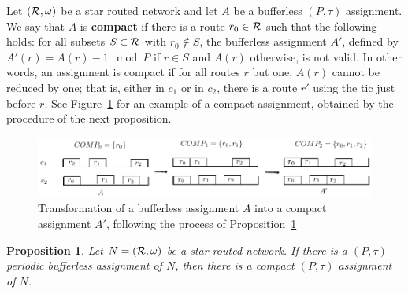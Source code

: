 \documentclass[a4paper,10pt]{journal}
\newtheorem{proposition}{Proposition}
\begin{document}
Let $({\cal R},\omega)$ be a star routed network and let $A$ be a bufferless $(P,\tau)$ assignment.
We say that $A$ is \textbf{compact} if there is a route $r_0 \in \cal{R}$ such that the following holds: for all subsets $S\subset \cal{R}$ with $r_0 \notin S$, the bufferless assignment $A'$, defined by $A'(r) = A(r) - 1 \mod P$ if $r \in S$ and $A(r)$ otherwise, is not valid. In other words, an assignment is compact if for all routes $r$ but one, $A(r)$ cannot be reduced by one; that is, either in $c_1$ or in $c_2$, there is a route $r'$ using the tic just before $r$. See Figure~\ref{fig:compact} for an example of a compact assignment, obtained by the procedure of the next proposition. 
  \begin{figure}
      \begin{center} 
      \includegraphics[width=\textwidth]{compacttoassignment.pdf}
      \end{center}
      \caption{Transformation of a bufferless assignment $A$ into a compact assignment $A'$, following the process of Proposition~\ref{prop:compactification}}
      \label{fig:compact}
      \end{figure}
\begin{proposition}\label{prop:compactification}
Let $N = ({\cal R}, \omega)$ be a star routed network. If there is a $(P,\tau)$-periodic bufferless assignment of $N$, then there is a compact $(P,\tau)$ assignment of $N$.
\end{proposition}
\end{document}
